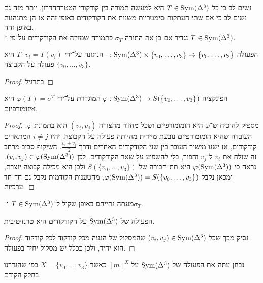 נשים לב כי כל $T \in \operatorname{Sym}(\Delta^3)$ היא למעשה תמורה בין קודקודי הטטרההדרון. יותר מזה גם נשים לב כי אם שתי העתקות סימטריות משנות את הקודקודים באופן זהה אז הן מתנהגות באופן זהה. \\*
נגדיר אם כן את התורה $\sigma_T$ כתמורה שמזיזה את הקודקודים על־פי $T \in \operatorname{Sym}(\Delta^3)$.

\begin{proposition}
	הפעולה $\cdot : \operatorname{Sym}(\Delta^3) \times \{v_0, \dots, v_3\} \to \{v_0, \dots, v_3\}$ הנתונה על־ידי $T \cdot v_i = T(v_i)$ היא פעולה על הקבוצה $\{v_0, \dots, v_3\}$.
\end{proposition}
\begin{proof}
	בתרגיל
\end{proof}
\begin{conclusion}
	הפונקציה $\varphi : \operatorname{Sym}(\Delta^3) \to S(\{v_0, \dots, v_3\})$ המוגדרת על־ידי $\varphi(T) = \sigma^T$ היא איזומורפיזם.
\end{conclusion}
\begin{proof}
	מספיק להוכיח ש־$\varphi$ היא הומומורפיזם ושכל מחזור מהצורה $(v_i, v_j)$ הוא בתמונת $\varphi$.
	העובדה שהיא הומומורפיזם נובעת מיידית מהיותה פעולה על הקבוצה.
	יהיו $i \ne j$ המתארים קודקודים, אז ישנו מישור העובר בין שני הקודקודים האחרים ודרך $\frac{v_i + v_j}{2}$.
	השיקוף סביב מרחב זה שולח את $v_i$ ל־$v_j$ והפוך, בלי להשפיע על שאר הקודקודים.
	לכן $(v_i, v_j) \in \varphi(\operatorname{Sym}(\Delta^3))$. נראה כי $\varphi(\operatorname{Sym}(\Delta^3))$ היא תת־חבורה של $S(\{v_0, \dots, v_3\})$ ולכן היא מכילה קבוצה יוצרת, ומכאן נקבל
	$\varphi(\operatorname{Sym}(\Delta^3)) = S(\{v_0, \dots, v_3\})$, מהטענות הקודמות נקבל גם חד־חד ערכיות.
\end{proof}
מעתה נתייחס באופן שקול ל־$T \in \operatorname{Sym}(\Delta^3)$ ו־$\sigma_T$.
\begin{conclusion}
	הפעולה של $\operatorname{Sym}(\Delta^3)$ על הקודקודים היא טרנזיטיבית.
\end{conclusion}
\begin{proof}
	נסיק מכך שכל $(v_i, v_j) \in \operatorname{Sym}(\Delta^3)$ שהמסלול של הגעה מכל קודקוד לכל קודקוד הוא יחיד, ולכן ככלל יש מסלול יחיד בפעולה.
\end{proof}

נבחן עתה את הפעולה של $\operatorname{Sym}(\Delta^3)$ על ${[m]}^X$ כאשר $X = \{v_0, \dots, v_3\}$ כפי שהגדרנו בחלק הקודם.

